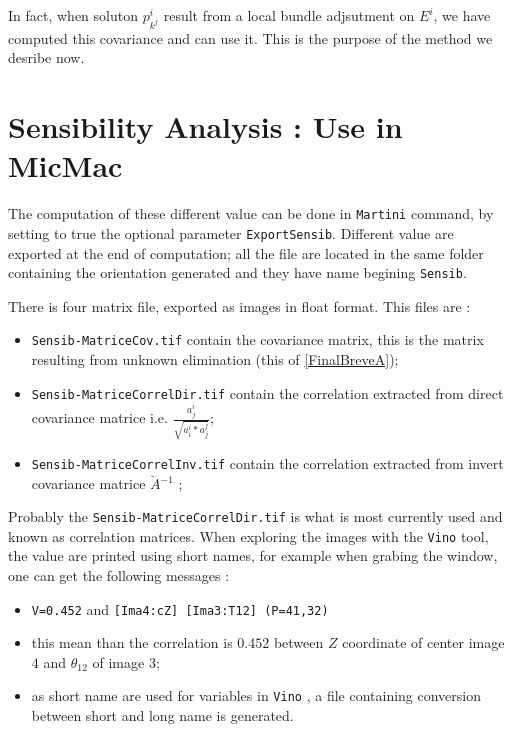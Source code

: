 In fact, when soluton $p^i_{k^j}$  result from a local bundle adjsutment on $E^i$,
we have computed this covariance and can use it.
This is the purpose of the method we desribe now.










\section{Sensibility Analysis : Use in MicMac}

The computation of these different value can be done in {\tt Martini} command,
by setting to true the optional parameter {\tt ExportSensib}. Different
value are exported at the end of computation; all the file are located
in the same folder containing the orientation generated and they  have name
begining  {\tt Sensib}.


There is four matrix file, exported as images in float format. This files
are : 

\begin{itemize}
     \item {\tt Sensib-MatriceCov.tif}  contain the covariance matrix,
           this is the matrix resulting from unknown elimination (this of \ref{FinalBreveA});

     \item {\tt Sensib-MatriceCorrelDir.tif}  contain the correlation extracted from
           direct covariance matrice i.e.  $ \frac{a^i_j}{\sqrt{a^i_i * a^j_j}}$;

     \item {\tt Sensib-MatriceCorrelInv.tif}  contain the correlation extracted from
           invert covariance matrice $\breve{A} {^{-1}}$  ;
\end{itemize}

Probably the {\tt Sensib-MatriceCorrelDir.tif} is what  is most currently used
and known as correlation matrices. When exploring the images with the {\tt Vino}
tool, the value are printed using short names, for example when grabing the 
window, one can get the following messages :


\begin{itemize}
     \item {\tt V=0.452} and {\tt [Ima4:cZ] [Ima3:T12] (P=41,32)}
     \item this mean than the correlation is $0.452$ between $Z$ coordinate of center
           image $4$  and $\theta_{12}$ of image $3$;
      \item as short name are used for variables in {\tt Vino} , a file containing conversion
            between short and long name is generated.
\end{itemize}


